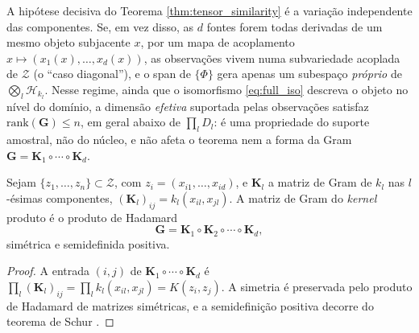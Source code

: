 \begin{remark}\label{rem:diagonal_case}
A hipótese decisiva do Teorema \ref{thm:tensor_similarity} é a variação independente das componentes. Se, em vez disso, as $d$ fontes forem todas derivadas de um mesmo objeto subjacente $x$, por um mapa de acoplamento $x \mapsto (x_1(x), \dots, x_d(x))$, as observações vivem numa subvariedade acoplada de $\mathcal{Z}$ (o ``caso diagonal''), e o span de $\{\Phi\}$ gera apenas um subespaço \emph{próprio} de $\bigotimes_l \mathcal{H}_{k_l}$. Nesse regime, ainda que o isomorfismo \eqref{eq:full_iso} descreva o objeto no nível do domínio, a dimensão \emph{efetiva} suportada pelas observações satisfaz $\mathrm{rank}(\mathbf{G}) \leq n$, em geral abaixo de $\prod_l D_l$: é uma propriedade do suporte amostral, não do núcleo, e não afeta o teorema nem a forma da Gram $\mathbf{G} = \mathbf{K}_1 \circ \cdots \circ \mathbf{K}_d$.
\end{remark}
 
\begin{corollary}\label{cor:hadamard_form}
Sejam $\{z_1, \dots, z_n\} \subset \mathcal{Z}$, com $z_i = (x_{i1}, \dots, x_{id})$, e $\mathbf{K}_l$ a matriz de Gram de $k_l$ nas $l$-ésimas componentes, $(\mathbf{K}_l)_{ij} = k_l(x_{il}, x_{jl})$. A matriz de Gram do \textit{kernel} produto é o produto de Hadamard
\begin{equation}\label{eq:tensor_sim_gram}
    \mathbf{G} = \mathbf{K}_1 \circ \mathbf{K}_2 \circ \cdots \circ \mathbf{K}_d,
\end{equation}
simétrica e semidefinida positiva.
\end{corollary}
 
\begin{proof}
A entrada $(i,j)$ de $\mathbf{K}_1 \circ \cdots \circ \mathbf{K}_d$ é $\prod_l (\mathbf{K}_l)_{ij} = \prod_l k_l(x_{il}, x_{jl}) = K(z_i, z_j)$. A simetria é preservada pelo produto de Hadamard de matrizes simétricas, e a semidefinição positiva decorre do teorema de Schur \citep{Schur1911, HornJohnson2013}.
\end{proof}
 

